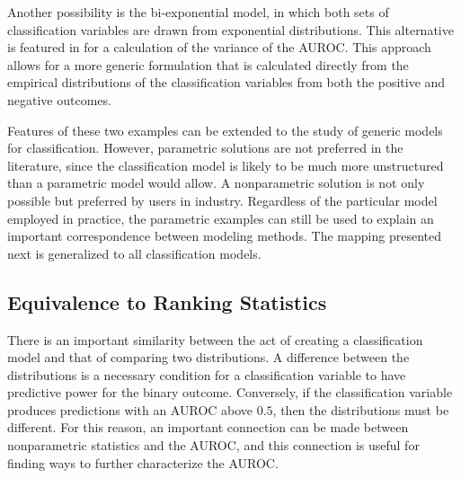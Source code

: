 
Another possibility is the bi-exponential model, in which both sets of classification variables are drawn from exponential distributions.
%
This alternative is featured in \citet{hanleymcneil1982} for a calculation of the variance of the AUROC.
This approach allows for a more generic formulation that is calculated directly from the empirical distributions of the classification variables from both the positive and negative outcomes.
%




Features of these two examples can be extended to the study of generic models for classification.
However, parametric solutions are not preferred in the literature, since the classification model is likely to be much more unstructured than a parametric model would allow.
A nonparametric solution is not only possible but preferred by users in industry.
Regardless of the particular model employed in practice, the parametric examples can still be used to explain an important correspondence between modeling methods.
The mapping presented next is generalized to all classification models.

\subsection{Equivalence to Ranking Statistics}



There is an important similarity between the act of creating a classification model and that of comparing two distributions.
%
A difference between the distributions is a necessary condition for a classification variable to have predictive power for the binary outcome.
Conversely, if the classification variable produces predictions with an AUROC above $0.5$, then the distributions must be different.
%
For this reason, an important connection can be made between nonparametric statistics and the AUROC, and this connection is useful for finding ways to further characterize the AUROC.

